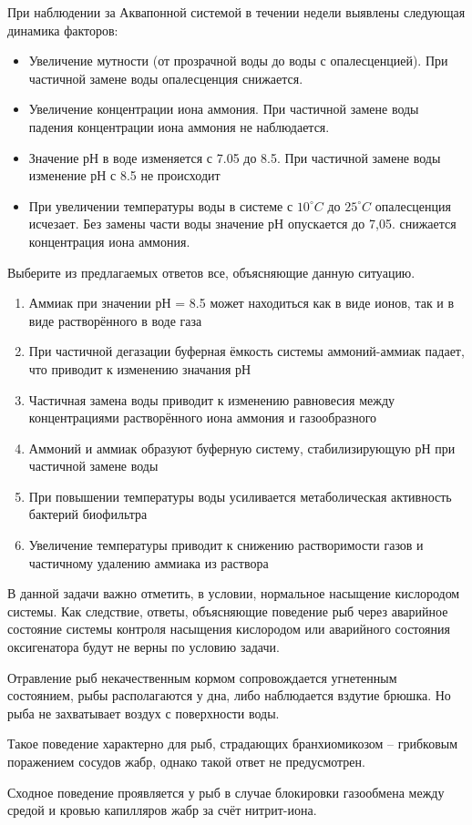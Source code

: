 
При наблюдении за Аквапонной системой в течении недели выявлены следующая динамика факторов:

\begin{itemize}
    \item Увеличение мутности (от прозрачной воды до воды с опалесценцией). При частичной замене воды опалесценция снижается.
    \item Увеличение концентрации  иона аммония. При частичной замене воды падения концентрации иона аммония не наблюдается.
    \item Значение рН в воде изменяется с 7.05 до 8.5. При частичной замене воды изменение рН с 8.5 не происходит
    \item При увеличении температуры воды в системе с $10^{\circ}C$ до $25^{\circ}C$ опалесценция исчезает. Без замены части воды значение  рН опускается до 7,05. снижается концентрация иона аммония.
\end{itemize}

Выберите из предлагаемых ответов все, объясняющие данную ситуацию.

\begin{enumerate}
    \item Аммиак при значении рН = 8.5 может находиться как в виде ионов, так и в виде растворённого в воде газа
    \item При частичной дегазации буферная ёмкость системы аммоний-аммиак падает, что приводит к изменению значания рН
    \item Частичная замена воды приводит к изменению равновесия между концентрациями растворённого иона аммония и газообразного
    \item Аммоний и аммиак образуют буферную систему, стабилизирующую рН при частичной замене воды
    \item При повышении температуры воды усиливается метаболическая активность бактерий биофильтра
    \item Увеличение температуры приводит к снижению растворимости газов и частичному удалению аммиака из раствора
\end{enumerate}

\explanationSection

В данной задачи важно отметить, в условии, нормальное насыщение кислородом системы. Как следствие, ответы, объясняющие поведение рыб через аварийное состояние системы контроля насыщения кислородом или аварийного состояния оксигенатора будут не верны по условию задачи.

Отравление рыб некачественным кормом сопровождается угнетенным состоянием, рыбы располагаются у дна, либо наблюдается вздутие брюшка. Но рыба не захватывает воздух с поверхности воды. 

Такое поведение характерно для рыб, страдающих бранхиомикозом – грибковым поражением сосудов жабр, однако такой ответ не предусмотрен. 

Сходное поведение проявляется у рыб в случае блокировки газообмена между средой и кровью капилляров жабр за счёт нитрит-иона.

